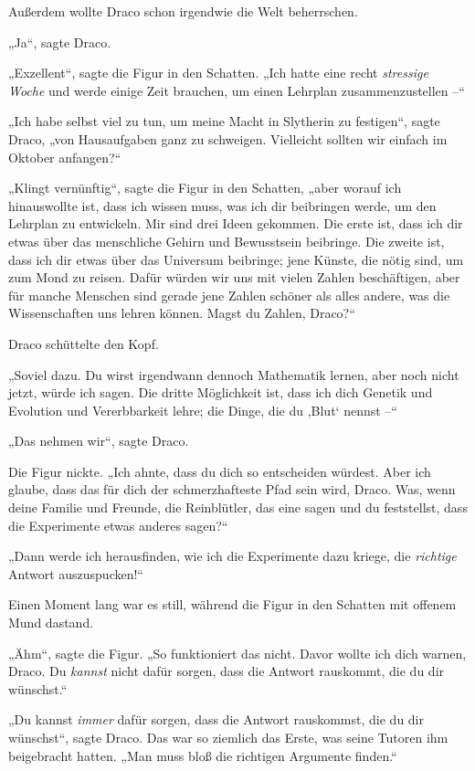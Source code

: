Außerdem wollte Draco schon irgendwie die Welt beherrschen. 

„Ja“, sagte Draco. 

„Exzellent“, sagte die Figur in den Schatten. „Ich hatte eine recht \emph{stressige Woche} und werde einige Zeit brauchen, um einen Lehrplan zusammenzustellen –“ 

„Ich habe selbst viel zu tun, um meine Macht in Slytherin zu festigen“, sagte Draco, „von Hausaufgaben ganz zu schweigen. Vielleicht sollten wir einfach im Oktober anfangen?“ 

„Klingt vernünftig“, sagte die Figur in den Schatten, „aber worauf ich hinauswollte ist, dass ich wissen muss, was ich dir beibringen werde, um den Lehrplan zu entwickeln. Mir sind drei Ideen gekommen. Die erste ist, dass ich dir etwas über das menschliche Gehirn und Bewusstsein beibringe. Die zweite ist, dass ich dir etwas über das Universum beibringe; jene Künste, die nötig sind, um zum Mond zu reisen. Dafür würden wir uns mit vielen Zahlen beschäftigen, aber für manche Menschen sind gerade jene Zahlen schöner als alles andere, was die Wissenschaften uns lehren können. Magst du Zahlen, Draco?“ 

Draco schüttelte den Kopf. 

„Soviel dazu. Du wirst irgendwann dennoch Mathematik lernen, aber noch nicht jetzt, würde ich sagen. Die dritte Möglichkeit ist, dass ich dich Genetik und Evolution und Vererbbarkeit lehre; die Dinge, die du ‚Blut‘ nennst –“ 

„Das nehmen wir“, sagte Draco. 

Die Figur nickte. „Ich ahnte, dass du dich so entscheiden würdest. Aber ich glaube, dass das für dich der schmerzhafteste Pfad sein wird, Draco. Was, wenn deine Familie und Freunde, die Reinblütler, das eine sagen und du feststellst, dass die Experimente etwas anderes sagen?“ 

„Dann werde ich herausfinden, wie ich die Experimente dazu kriege, die \emph{richtige} Antwort auszuspucken!“ 

Einen Moment lang war es still, während die Figur in den Schatten mit offenem Mund dastand. 

„Ähm“, sagte die Figur. „So funktioniert das nicht. Davor wollte ich dich warnen, Draco. Du \emph{kannst} nicht dafür sorgen, dass die Antwort rauskommt, die du dir wünschst.“ 

„Du kannst \emph{immer} dafür sorgen, dass die Antwort rauskommst, die du dir wünschst“, sagte Draco. Das war so ziemlich das Erste, was seine Tutoren ihm beigebracht hatten. „Man muss bloß die richtigen Argumente finden.“ 


